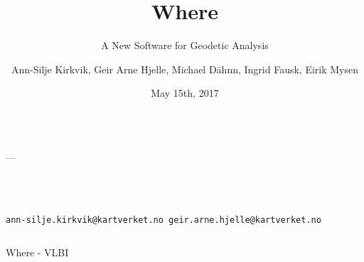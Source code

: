 \documentclass{beamer}
\title{Where}
\subtitle{A New Software for Geodetic Analysis}
\author{Ann-Silje Kirkvik, Geir Arne Hjelle, Michael D\"ahnn, Ingrid Fausk, Eirik Mysen}
\institute{Norwegian Mapping Authority, Geodetic Institute}
\date{May 15th, 2017}
\makeatletter
\newcommand{\contact}{ann-silje.kirkvik@kartverket.no geir.arne.hjelle@kartverket.no}
\makeatother
\begin{document}
\begin{frame}[t]
  \color{white} 
  \vspace*{2cm}
  \begin{columns}
    \begin{column}[t]{.97\textwidth}
      {\bfseries\fontsize{88}{120}\selectfont \inserttitle}
      {\fontsize{88}{120}\selectfont\kern2cm---\kern2cm\insertsubtitle}
    \end{column}
  \end{columns}

  \vspace*{2cm}
  \begin{columns}
    \begin{column}[t]{.25\textwidth}
      {\fontsize{30}{36}\selectfont\insertauthor\\[0.5cm]
        \fontsize{30}{36}\selectfont{\itshape\insertinstitute}\\
        \fontsize{24}{18}\selectfont\texttt{\contact}}
    \end{column}

    \begin{column}[t]{.7\textwidth}
      {\fontsize{30}{36}\selectfont\setlength{\parskip}{30pt}}
    \end{column}
  \end{columns}

  \begin{columns}

    \begin{column}[t]{.48\textwidth}
      \begin{block}{Where - VLBI}
        \begin{multicols}{2}
          
        \end{multicols}
      \end{block}
    \end{column}


\end{columns}
\end{frame}
\end{document}
